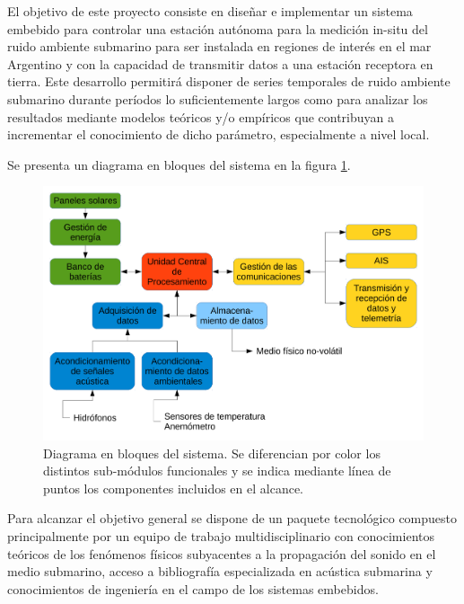 El objetivo de este proyecto consiste en diseñar e implementar un sistema embebido para controlar una estación autónoma para la medición in-situ del ruido ambiente submarino para ser instalada en regiones de interés en el mar Argentino y con la capacidad de transmitir datos a una estación receptora en tierra. Este desarrollo permitirá disponer de series temporales de ruido ambiente submarino durante períodos lo suficientemente largos como para analizar los resultados mediante modelos teóricos y/o empíricos que contribuyan a incrementar el conocimiento de dicho parámetro, especialmente a nivel local.

Se presenta un diagrama en bloques del sistema en la figura \ref{fig:diagramaBloques}.

\begin{figure}[h]
	\includegraphics[width=\textwidth]{./Figures/Diagrama_en_Bloques.pdf}
	\caption{Diagrama en bloques del sistema. Se diferencian por color los distintos sub-módulos funcionales y se indica mediante línea de puntos los componentes incluidos en el alcance.}
	\label{fig:diagramaBloques}
\end{figure}

Para alcanzar el objetivo general se dispone de un paquete tecnológico compuesto principalmente por un equipo de trabajo multidisciplinario con conocimientos teóricos de los fenómenos físicos subyacentes a la propagación del sonido en el medio submarino, acceso a bibliografía especializada en acústica submarina y  conocimientos de ingeniería en el campo de los sistemas embebidos.


